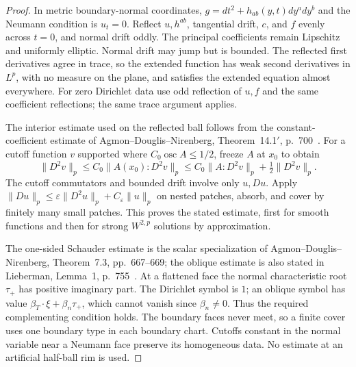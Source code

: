 \begin{proof}
In metric boundary-normal coordinates,
$g=dt^2+h_{ab}(y,t)dy^a dy^b$ and the Neumann condition is $u_t=0$.
Reflect $u,h^{ab}$, tangential drift, $c$, and $f$ evenly across $t=0$,
and normal drift oddly. The principal coefficients remain Lipschitz
and uniformly elliptic. Normal drift may jump but is bounded. The
reflected first derivatives agree in trace, so the extended function
has weak second derivatives in $L^p$, with no measure on the plane,
and satisfies the extended equation almost everywhere. For zero
Dirichlet data use odd reflection of $u,f$ and the same coefficient
reflections; the same trace argument applies.

The interior estimate used on the reflected ball follows from the
constant-coefficient estimate of Agmon--Douglis--Nirenberg,
Theorem~14.1$'$, p.~700~\cite{agmondouglisnirenberg1959}.
For a cutoff function $v$ supported where
$C_0\operatorname{osc}A\le1/2$, freeze $A$ at $x_0$ to obtain
\[
 \|D^2v\|_p
 \le C_0\|A(x_0):D^2v\|_p
 \le C_0\|A:D^2v\|_p+\tfrac12\|D^2v\|_p.
\]
The cutoff commutators and bounded drift involve only $u,Du$.
Apply $\|Du\|_p\le\varepsilon\|D^2u\|_p+C_\varepsilon\|u\|_p$
on nested patches, absorb, and cover by finitely many small patches.
This proves the stated estimate, first for smooth functions and then
for strong $W^{2,p}$ solutions by approximation.

The one-sided Schauder estimate is the scalar specialization of
Agmon--Douglis--Nirenberg, Theorem~7.3, pp.~667--669; the oblique
estimate is also stated in Lieberman, Lemma~1,
p.~755~\cite{lieberman1982}. At a flattened face the normal
characteristic root $\tau_+$ has positive imaginary part. The
Dirichlet symbol is $1$; an oblique symbol has value
$\beta_T\cdot\xi+\beta_n\tau_+$, which cannot vanish since
$\beta_n\ne0$. Thus the required complementing condition holds.
The boundary faces never meet, so a finite cover uses one boundary
type in each boundary chart. Cutoffs constant in the normal variable
near a Neumann face preserve its homogeneous data. No estimate at an
artificial half-ball rim is used.


\end{proof}

